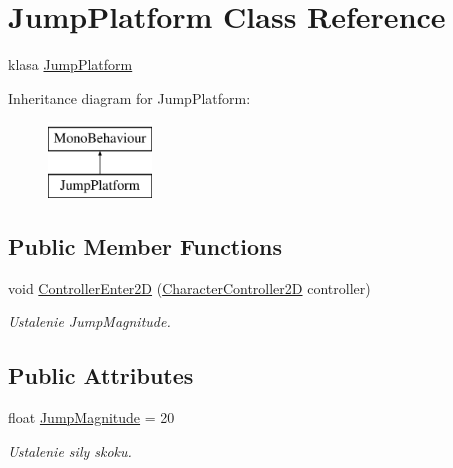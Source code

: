 \hypertarget{class_jump_platform}{}\section{Jump\+Platform Class Reference}
\label{class_jump_platform}


klasa \hyperlink{class_jump_platform}{Jump\+Platform}  


Inheritance diagram for Jump\+Platform\+:\begin{figure}[H]
\begin{center}
\leavevmode
\includegraphics[height=2.000000cm]{class_jump_platform}
\end{center}
\end{figure}
\subsection*{Public Member Functions}
\begin{DoxyCompactItemize}
\item 
\hypertarget{class_jump_platform_ad1e3b06d092b641e4ef9e773aba1de6d}{}void \hyperlink{class_jump_platform_ad1e3b06d092b641e4ef9e773aba1de6d}{Controller\+Enter2\+D} (\hyperlink{class_character_controller2_d}{Character\+Controller2\+D} controller)\label{class_jump_platform_ad1e3b06d092b641e4ef9e773aba1de6d}

\begin{DoxyCompactList}\small\item\em Ustalenie Jump\+Magnitude. \end{DoxyCompactList}\end{DoxyCompactItemize}
\subsection*{Public Attributes}
\begin{DoxyCompactItemize}
\item 
\hypertarget{class_jump_platform_a089d1fb7693297d093994570c338ad75}{}float \hyperlink{class_jump_platform_a089d1fb7693297d093994570c338ad75}{Jump\+Magnitude} = 20\label{class_jump_platform_a089d1fb7693297d093994570c338ad75}

\begin{DoxyCompactList}\small\item\em Ustalenie sily skoku. \end{DoxyCompactList}\end{DoxyCompactItemize}


